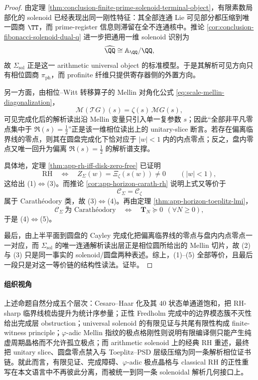 \begin{proof}
由定理 \ref{thm:conclusion-finite-prime-solenoid-terminal-object}，有限素数局部化的 solenoid 已经表现出同一刚性特征：其全部连通 Lie 可见部分都压缩到唯一圆商 \(\TT\)，而 prime-register 信息则滞留在全不连通核中。推论 \ref{cor:conclusion-fibonacci-solenoid-dual-q} 进一步把通用一维 solenoid 识别为
\[
\widehat{\QQ}\cong \mathbb A_{\QQ}/\QQ,
\]
故 \(\Sigma_{\mathrm{sol}}\) 正是这一 arithmetic universal object 的标准模型。于是其解析可见方向只有相位圆商 \(\pi_{\mathrm{ph}}\)，而 profinite 纤维只提供寄存器侧的外置方向。

另一方面，由相位--Witt 转移算子的 Mellin 对角化公式 \eqref{eq:scale-mellin-diagonalization}，
\[
\mathcal M(\mathcal T G)(s)=\zeta(s)\,\mathcal M G(s),
\]
可见完成化后的解析读出沿 Mellin 变量只引入单一复参数 \(s\)；因此“全部非平凡零点集中于 \(\Re(s)=\tfrac12\)”正是该一维相位读出上的 unitary-slice 断言。若存在偏离临界线的零点，则其在圆盘完成化下恰对应于 \(|w|<1\) 内的内点零点；反之，盘内零点又唯一回升为偏离 \(\Re(s)=\tfrac12\) 的解析谱支撑。

具体地，定理 \ref{thm:app-rh-iff-disk-zero-free} 已证明
\[
\mathrm{RH}
\quad\Longleftrightarrow\quad
Z_\Sigma(w)=\Xi_\zeta(s(w))\neq 0
\qquad (|w|<1),
\]
这给出 (1)\(\Leftrightarrow\)(3)。而推论 \ref{cor:app-horizon-carath-rh} 说明上式又等价于
\[
\mathscr C_\Sigma=\mathscr C_\zeta
\]
属于 Carath\'eodory 类，故 (3)\(\Leftrightarrow\)(4)。再由定理 \ref{thm:app-horizon-toeplitz-lmi}，
\[
\mathscr C_\Sigma\ \text{为 Carath\'eodory}
\quad\Longleftrightarrow\quad
\mathbf T_N\succeq 0\ \ (\forall N\ge 0),
\]
于是 (4)\(\Leftrightarrow\)(5)。

最后，由上半平面到圆盘的 Cayley 完成化把偏离临界线的零点与盘内内点零点一一对应，而 \(\Sigma_{\mathrm{sol}}\) 的唯一连通解析读出层正是相位圆所给出的 Mellin 切片，故 (2) 与 (3) 只是同一事实的 solenoid/圆盘两种表述。综上，(1)--(5) 全部等价，且最后一段只是对这一等价链的结构性读法。证毕。
\end{proof}



\paragraph{组织视角}
上述命题自然分成五个层次：Cesaro--Haar 化及其 \(40\) 状态单通道饱和，把 RH-sharp 临界线梳齿提升为统计序参量；正性 Fredholm 完成中的边界模态簇不灭性给出完成层 obstruction；universal solenoid 的有限见证与共尾有限性构成 finite-witness principle；\(\varphi\)-adic Mellin 指纹的极点格刚性则说明有限编译侧只能产生纯虚周期晶格而不允许孤立极点；而 arithmetic solenoid 上的经典 RH 重述，最终把 unitary slice、圆盘零点禁入与 Toeplitz--PSD 层级压缩为同一条解析相位证书链。就此而言，有限见证、完成障碍、\(\varphi\)-adic 极点晶格与 classical RH 的正性重写在本文语言中不再彼此分离，而被统一到同一条 solenoidal 解析几何接口上。

\endinput
